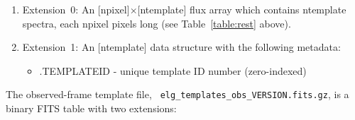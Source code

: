 \documentclass[11pt]{article}
\begin{document}

\begin{enumerate}
\item{Extension~0: An [{\sc npixel}]$\times$[{\sc ntemplate}] flux
  array which contains {\sc ntemplate} spectra, each {\sc npixel}
  pixels long (see Table~\ref{table:rest} above).}
\item{Extension~1: An [{\sc ntemplate}] data structure with the
  following metadata:
\begin{itemize}
\item{.{\sc TEMPLATEID} - unique template ID number (zero-indexed)}
\end{itemize}
}
\end{enumerate}

The observed-frame template file, {\tt
  elg\_templates\_obs\_VERSION.fits.gz}, is a binary FITS table with
two extensions:
\end{document}
